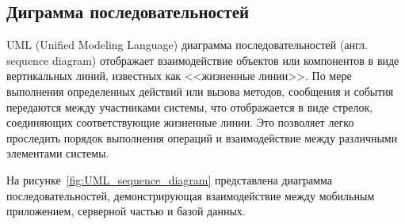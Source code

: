 \subsection{Диграмма последовательностей}




UML (Unified Modeling Language) диаграмма последовательностей (англ. sequence diagram) отображает
взаимодействие объектов или компонентов в виде вертикальных линий, известных как <<жизненные линии>>.
По мере выполнения определенных действий или вызова методов,
сообщения и события передаются между участниками системы,
что отображается в виде стрелок, соединяющих соответствующие жизненные линии.
Это позволяет легко проследить порядок выполнения операций и взаимодействие между различными элементами системы.

На рисунке~\ref{fig:UML_sequence_diagram} представлена диаграмма последовательностей,
демонстрирующая взаимодействие между мобильным приложением, серверной частью и базой данных.




